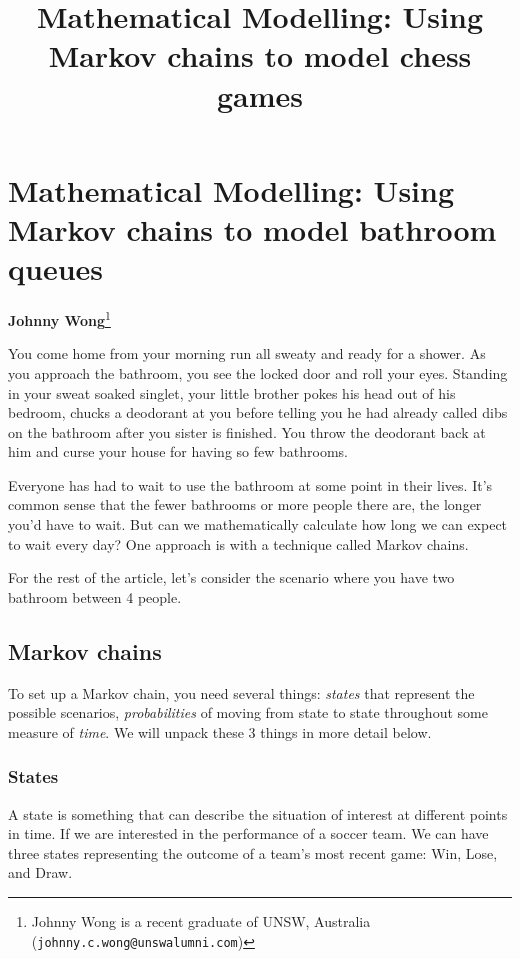 \usetikzlibrary{automata, positioning}

\section*{Mathematical Modelling: Using Markov chains to model bathroom queues}
\vspace{-.30cm}

\title{Mathematical Modelling: Using Markov chains to model chess games}

\begin{center}
	\textbf{Johnny Wong}\footnote{%
		Johnny Wong is a recent graduate of UNSW, Australia ({\tt johnny.c.wong@unswalumni.com})}
\end{center}

\vspace{5mm}

You come home from your morning run all sweaty and ready for a shower. As you approach the bathroom, you see the locked door and roll your eyes. Standing in your sweat soaked singlet, your little brother pokes his head out of his bedroom, chucks a deodorant at you before telling you he had already called dibs on the bathroom after you sister is finished. You throw the deodorant back at him and curse your house for having so few bathrooms.

Everyone has had to wait to use the bathroom at some point in their lives. It's common sense that the fewer bathrooms or more people there are, the longer you'd have to wait. But can we mathematically calculate how long we can expect to wait every day? One approach is with a technique called Markov chains.

For the rest of the article, let's consider the scenario where you have two bathroom between 4 people.

\subsection*{Markov chains}
To set up a Markov chain, you need several things: \textit{states} that represent the possible scenarios, \textit{probabilities} of moving from state to state throughout some measure of \textit{time}. We will unpack these 3 things in more detail below.

\subsubsection*{States}
A state is something that can describe the situation of interest at different points in time. If we are interested in the performance of a soccer team. We can have three states representing the outcome of a team's most recent game: Win, Lose, and Draw.


